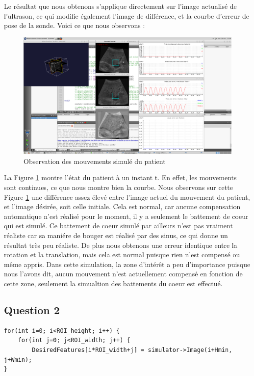 \documentclass[a4paper,11pt]{article}
\begin{document}

Le r\'esultat que nous obtenons s'applique directement sur l'image actualis\'e de l'ultrason, ce qui modifie \'egalement l'image de diff\'erence, et la courbe d'erreur de pose de la sonde. Voici ce que nous observons :
\begin{figure}
	\centering
		\includegraphics[width=500px]{./images/question1.png}
	\caption{Observation des mouvements simul\'e du patient}
	\label{mvtPatient}
\end{figure}

La Figure \ref{mvtPatient} montre l'\'etat du patient \`a un instant t. En effet, les mouvements sont continues, ce que nous montre bien la courbe. Nous observons sur cette Figure \ref{mvtPatient} une diff\'erence assez \'elev\'e entre l'image actuel du mouvement du patient, et l'image d\'esir\'ee, soit celle initiale. Cela est normal, car aucune compensation automatique n'est r\'ealis\'e pour le moment, il y a seulement le battement de coeur qui est simul\'e. Ce battement de coeur simul\'e par ailleurs n'est pas vraiment r\'ealiste car sa mani\'ere de bouger est r\'ealis\'e par des sinus, ce qui donne un r\'esultat tr\`es peu r\'ealiste. De plus nous obtenons une erreur identique entre la rotation et la translation, mais cela est normal puisque rien n'est compens\'e ou m\^eme appris.
Dans cette simulation, la zone d'int\'er\^et a peu d'importance puisque nous l'avons dit, aucun mouvement n'est actuellement compens\'e en fonction de cette zone, seulement la simualtion des battements du coeur est effectu\'e.

\subsection{Question 2}
\begin{verbatim}
for(int i=0; i<ROI_height; i++) {
	for(int j=0; j<ROI_width; j++) {
		DesiredFeatures[i*ROI_width+j] = simulator->Image(i+Hmin, j+Wmin);
}
\end{verbatim}
\end{document}
